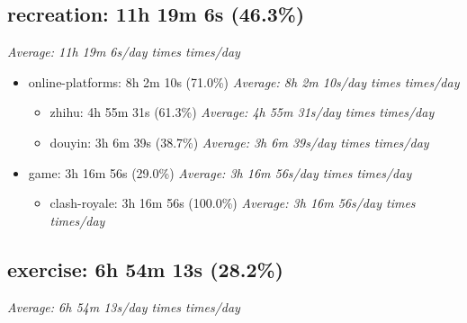 \documentclass[12pt]{extarticle}
\begin{document}
{\fontsize{16}{19.2}\selectfont\subsection*{recreation: 11h 19m 6s (46.3\%)}}
\textit{Average: 11h 19m 6s/day  times  times/day}\par
\begin{itemize}[topsep=0pt, itemsep=-0.5ex]
    \item online-platforms: 8h 2m 10s (71.0\%)
        \textit{Average: 8h 2m 10s/day  times  times/day}\par
\begin{itemize}[topsep=0pt, itemsep=-0.5ex]
    \item zhihu: 4h 55m 31s (61.3\%)
        \textit{Average: 4h 55m 31s/day  times  times/day}\par
    \item douyin: 3h 6m 39s (38.7\%)
        \textit{Average: 3h 6m 39s/day  times  times/day}\par
\end{itemize}
    \item game: 3h 16m 56s (29.0\%)
        \textit{Average: 3h 16m 56s/day  times  times/day}\par
\begin{itemize}[topsep=0pt, itemsep=-0.5ex]
    \item clash-royale: 3h 16m 56s (100.0\%)
        \textit{Average: 3h 16m 56s/day  times  times/day}\par
\end{itemize}
\end{itemize}
{\fontsize{16}{19.2}\selectfont\subsection*{exercise: 6h 54m 13s (28.2\%)}}
\textit{Average: 6h 54m 13s/day  times  times/day}\par
\end{document}
